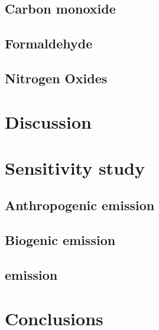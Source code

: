 	
	
\subsection{Carbon monoxide}\label{ssec:2006/gen/co}
\subsection{Formaldehyde}\label{ssec:2006/gen/form}
\subsection{Nitrogen Oxides}\label{ssec:2006/gen/nox}

\section{Discussion}\label{sec:2006/discussion}

\section{Sensitivity study}\label{sec:2006/sens}
\subsection{Anthropogenic emission}\label{ssec:2006/sens/anthrop}
\subsection{Biogenic emission}\label{ssec:2006/sens/bio}
\subsection{{\lnox} emission}\label{ssec:2006/sens/lnox}

\section{Conclusions}\label{sec:2006/conslusion}